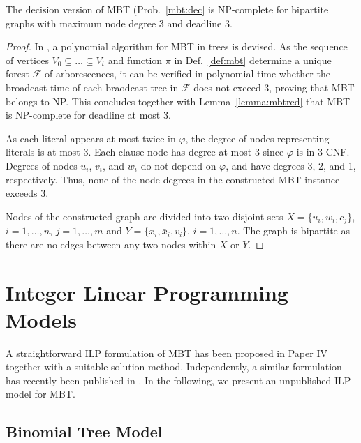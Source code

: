 \begin{proposition}
The decision version of MBT (Prob.~\ref{mbt:dec} is NP-complete for bipartite graphs with maximum node degree 3 and deadline 3.
\end{proposition}
\begin{proof}
In \cite{slater81}, a polynomial algorithm for MBT in trees is devised.
As the sequence of vertices $V_0\subseteq\dots\subseteq V_t$ and function $\pi$ in Def.~\ref{def:mbt} determine a unique forest $\mathcal{F}$ of arborescences,
it can be verified in polynomial time whether the broadcast time of each braodcast tree in $\mathcal{F}$ does not exceed 3, proving that MBT belongs to NP.
This concludes together with Lemma~\ref{lemma:mbtred} that MBT is NP-complete for deadline at most 3.

As each literal appears at most twice in $\varphi$, the degree of nodes representing literals is at most 3. 
Each clause node has degree at most 3 since $\varphi$ is in 3-CNF.
Degrees of nodes $u_i$, $v_i$, and $w_i$ do not depend on $\varphi$, and have degrees 3, 2, and 1, respectively.
Thus, none of the node degrees in the constructed MBT instance exceeds 3.

Nodes of the constructed graph are divided into two disjoint sets $X=\{u_i,w_i,c_j\}$, $i=1,\dots,n$, $j=1,\dots,m$ and $Y=\{x_i,\bar{x}_i,v_i\}$, $i=1,\dots,n$.
The graph is bipartite as there are no edges between any two nodes within $X$ or $Y$.
\end{proof}

\section{Integer Linear Programming Models}

A straightforward ILP formulation of MBT has been proposed in Paper IV together with a suitable solution method.
Independently, a similar formulation has recently been published in \cite{desousa18}.
In the following, we present an unpublished ILP model for MBT.

\subsection{Binomial Tree Model}

